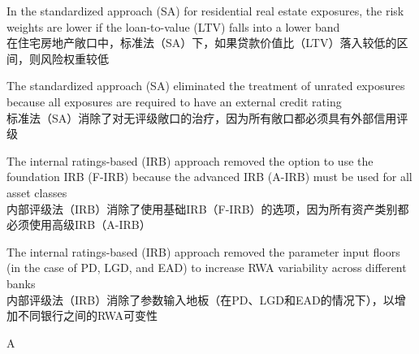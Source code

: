 \documentclass{article}
\begin{document}
  \begin{choices}
      \item In the standardized approach (SA) for residential real estate exposures, the risk weights are lower if the loan-to-value (LTV) falls into a lower band\\在住宅房地产敞口中，标准法（SA）下，如果贷款价值比（LTV）落入较低的区间，则风险权重较低
      \item The standardized approach (SA) eliminated the treatment of unrated exposures because all exposures are required to have an external credit rating\\标准法（SA）消除了对无评级敞口的治疗，因为所有敞口都必须具有外部信用评级
      \item The internal ratings-based (IRB) approach removed the option to use the foundation IRB (F-IRB) because the advanced IRB (A-IRB) must be used for all asset classes\\内部评级法（IRB）消除了使用基础IRB（F-IRB）的选项，因为所有资产类别都必须使用高级IRB（A-IRB）
      \item The internal ratings-based (IRB) approach removed the parameter input floors (in the case of PD, LGD, and EAD) to increase RWA variability across different banks\\内部评级法（IRB）消除了参数输入地板（在PD、LGD和EAD的情况下），以增加不同银行之间的RWA可变性
  \end{choices}
  
  \begin{correctanswer}
  A
  \end{correctanswer}
  
\end{document}
